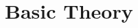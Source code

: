 \documentclass{uvamath}
\theoremstyle{remark}
\theoremstyle{definition}
\theoremstyle{definition}
\theoremstyle{definition}
\theoremstyle{definition}
\theoremstyle{definition}
\begin{document}



\chapter{Basic Theory\label{sect:basic_theory}}
\end{document}
